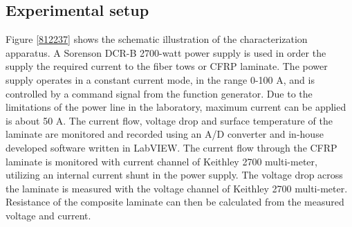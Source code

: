 \subsection{Experimental setup}

Figure \ref{812237}  shows the schematic illustration of the characterization apparatus. A Sorenson DCR-B 2700-watt power supply is used in order the supply the required current to the fiber tows or CFRP laminate. The power supply operates in a constant current mode, in the range 0-100 A, and is controlled by a command signal from the function generator. Due to the limitations of the power line in the laboratory, maximum current can be applied is about 50 A. The current flow, voltage drop and surface temperature of the laminate are monitored and recorded using an A/D converter and in-house developed software written in LabVIEW. The current flow through the CFRP laminate is monitored with current channel of Keithley 2700 multi-meter, utilizing an internal current shunt in the power supply. The voltage drop across the laminate is measured with the voltage channel of Keithley 2700 multi-meter. Resistance of the composite laminate can then be calculated from the measured voltage and current.
\